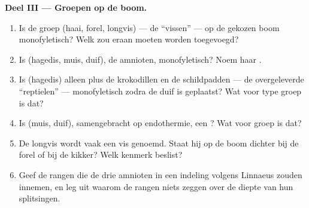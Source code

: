 \begin{problem}
\medskip
\noindent\textbf{Deel III --- Groepen op de boom.}
\begin{enumerate}[resume]
  \item Is de groep (haai, forel, longvis) --- de ``vissen'' --- op de
        gekozen boom monofyletisch? Welk  zou eraan moeten worden
        toegevoegd?
  \item Is (hagedis, muis, duif), de amnioten, monofyletisch? Noem haar
        .
  \item Is (hagedis) alleen plus de krokodillen en de schildpadden --- de
        overgeleverde ``reptielen'' --- monofyletisch zodra de duif is
        geplaatst? Wat voor type groep is dat?
  \item Is (muis, duif), samengebracht op endothermie, een ? Wat voor
         groep is dat?
  \item De longvis wordt vaak een vis genoemd. Staat hij op de boom
        dichter bij de forel of bij de kikker? Welk kenmerk beslist?
  \item Geef de rangen die de drie amnioten in een indeling volgens
        Linnaeus zouden innemen, en leg uit waarom de rangen niets zeggen
        over de diepte van hun splitsingen.
\end{enumerate}


\end{problem}
